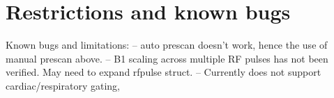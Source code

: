 
\chapter{Restrictions and known bugs}


Known bugs and limitations:
-- auto prescan doesn't work, hence the use of manual prescan above.
-- B1 scaling across multiple RF pulses has not been verified. May need to expand rfpulse struct.
-- Currently does not support cardiac/respiratory gating, 

